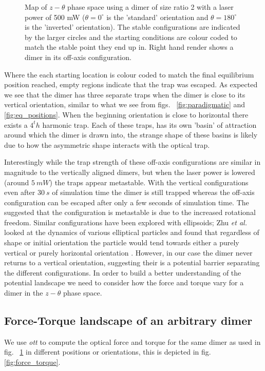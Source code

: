\begin{figure}[h!]
\begin{subfigure}{0.32\linewidth}
	\end{subfigure}
	\caption{Map of $z-\theta$ phase space using a dimer 
		of size ratio 2 with a laser power of 500 mW 
		($\theta=0^\circ$ is the 'standard' orientation 
		and $\theta=180^\circ$ is the 'inverted' 
		orientation). The stable configurations are 
		indicated by the larger circles and the 
		starting conditions are colour coded to match 
		the stable point they end up in. Right hand 
		render shows a dimer in its off-axis configuration.}
	\label{fig:off_axis}
\end{figure}

Where the each starting location is colour coded to
match the final equilibrium position reached, empty
regions indicate that the trap was escaped. As 
expected we see that the dimer has three separate 
traps when the dimer is close to its vertical 
orientation, similar to what we see from figs.~
\ref{fig:paradigmatic} and \ref{fig:eq_positions}. 
When the beginning orientation is close to horizontal 
there exists a $4^th$ harmonic trap. Each of these 
traps, has its own 'basin' of attraction around 
which the dimer is drawn into, the strange shape 
of these basins is likely due to how the asymmetric 
shape interacts with the optical trap.

Interestingly while the trap strength of these off-axis 
configurations are similar in magnitude to the vertically 
aligned dimers, but when the laser power is lowered 
(around $5\ mW$) the traps appear metastable. With the 
vertical configurations even after $30\ s$ of simulation
time the dimer is still trapped whereas the off-axis 
configuration can be escaped after only a few seconds of
simulation time. The suggested that the configuration is 
metastable is due to the increased rotational freedom. 
Similar configurations have been explored with ellipsoids; 
Zhu \textit{et al.} looked at the dynamics of various 
elliptical particles and found that regardless of shape or 
initial orientation the particle would tend towards either 
a purely vertical or purely horizontal orientation 
\cite{Zhu2021}. However, in our case the dimer never returns
to a vertical orientation, suggesting their is a potential 
barrier separating the different configurations. In order
to build a better understanding of the potential landscape 
we need to consider how the force and torque vary for a 
dimer in the $z-\theta$ phase space.  

\subsection{Force-Torque landscape of an arbitrary dimer}
We use \textit{ott} to compute the optical force 
and torque for the same dimer as used in fig.~
\ref{fig:off_axis} in different positions or 
orientations, this is depicted in fig.\ref{fig:force_torque}. 


